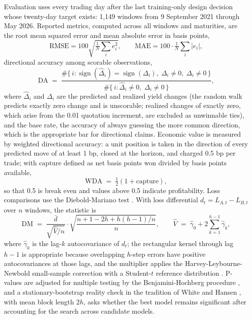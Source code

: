 \documentclass[10pt]{article}
\begin{document}
Evaluation uses every trading day after the last training-only design decision whose twenty-day target exists: 1{,}149 windows from 9 September 2021 through May 2026. Reported metrics, computed across all windows and maturities, are the root mean squared error and mean absolute error in basis points,
\begin{equation}
\mathrm{RMSE} = 100\sqrt{\tfrac{1}{N}\textstyle\sum_i e_i^2}, \qquad \mathrm{MAE} = 100 \cdot \tfrac{1}{N}\textstyle\sum_i |e_i|,
\end{equation}
directional accuracy among scorable observations,
\begin{equation}
\mathrm{DA} \;=\; \frac{\#\{\, i : \operatorname{sign}(\hat{\Delta}_i) = \operatorname{sign}(\Delta_i), \; \hat{\Delta}_i \neq 0, \; \Delta_i \neq 0 \,\}}{\#\{\, i : \hat{\Delta}_i \neq 0, \; \Delta_i \neq 0 \,\}},
\label{eq:da}
\end{equation}
where $\hat{\Delta}_i$ and $\Delta_i$ are the predicted and realized yield changes (the random walk predicts exactly zero change and is unscorable; realized changes of exactly zero, which arise from the 0.01 quotation increment, are excluded as unwinnable ties), and the base rate, the accuracy of always guessing the more common direction, which is the appropriate bar for directional claims. Economic value is measured by weighted directional accuracy: a unit position is taken in the direction of every predicted move of at least 1 bp, closed at the horizon, and charged 0.5 bp per trade; with $\mathrm{capture}$ defined as net basis points won divided by basis points available,
\begin{equation}
\mathrm{WDA} \;=\; \tfrac{1}{2}\left(1 + \mathrm{capture}\right),
\label{eq:wda}
\end{equation}
so that 0.5 is break even and values above 0.5 indicate profitability. Loss comparisons use the Diebold-Mariano test \cite{dieboldmariano1995}. With loss differential $d_t = L_{A,t} - L_{B,t}$ over $n$ windows, the statistic is
\begin{equation}
\mathrm{DM} \;=\; \frac{\bar{d}}{\sqrt{\hat{V}/n}} \cdot \sqrt{\frac{n + 1 - 2h + h(h-1)/n}{n}},
\qquad
\hat{V} \;=\; \hat{\gamma}_0 + 2\sum_{k=1}^{h-1}\hat{\gamma}_k,
\label{eq:dm}
\end{equation}
where $\hat{\gamma}_k$ is the lag-$k$ autocovariance of $d_t$; the rectangular kernel through lag $h-1$ is appropriate because overlapping $h$-step errors have positive autocovariances at those lags, and the multiplier applies the Harvey-Leybourne-Newbold small-sample correction with a Student-$t$ reference distribution \cite{harvey1997}. P-values are adjusted for multiple testing by the Benjamini-Hochberg procedure \cite{benjamini1995}, and a stationary-bootstrap reality check in the tradition of White and Hansen \cite{white2000, hansen2005, politisromano1994}, with mean block length $2h$, asks whether the best model remains significant after accounting for the search across candidate models.
\end{document}
